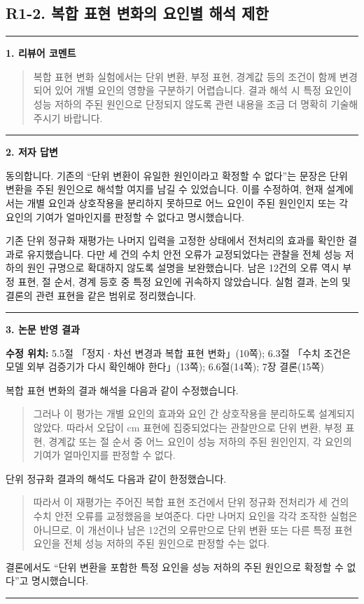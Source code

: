 \documentclass[11pt]{article}
\newcommand{\fieldheading}[2]{%
  \par\medskip\noindent
  {\color{#1}\rule{3pt}{1.25em}}\hspace{0.55em}\textbf{#2}\par\smallskip}
\newenvironment{reviewitem}[1]
  {\subsection*{#1}}
  {\par\medskip\hrule\bigskip}
\newenvironment{reviewercomment}
  {\fieldheading{reviewercolor}{1. 리뷰어 코멘트}%
   \begin{quote}}
  {\end{quote}}
\newenvironment{authorresponse}
  {\fieldheading{responsecolor}{2. 저자 답변}}
  {\par}
\newenvironment{manuscriptrevision}[1]
  {\fieldheading{revisioncolor}{3. 논문 반영 결과}%
   \textbf{수정 위치:} #1\par\smallskip}
  {\par}
\begin{document}
\clearpage
\begin{reviewitem}{R1-2. 복합 표현 변화의 요인별 해석 제한}
\begin{reviewercomment}
복합 표현 변화 실험에서는 단위 변환, 부정 표현, 경계값 등의 조건이 함께 변경되어 있어 개별 요인의 영향을 구분하기 어렵습니다. 결과 해석 시 특정 요인이 성능 저하의 주된 원인으로 단정되지 않도록 관련 내용을 조금 더 명확히 기술해 주시기 바랍니다.
\end{reviewercomment}
\begin{authorresponse}
동의합니다. 기존의 ``단위 변환이 유일한 원인이라고 확정할 수 없다''는 문장은
단위 변환을 주된 원인으로 해석할 여지를 남길 수 있었습니다.
이를 수정하여, 현재 설계에서는 개별 요인과 상호작용을 분리하지 못하므로
어느 요인이 주된 원인인지 또는 각 요인의 기여가 얼마인지를 판정할 수 없다고
명시했습니다.

기존 단위 정규화 재평가는 나머지 입력을 고정한 상태에서 전처리의 효과를
확인한 결과로 유지했습니다. 다만 세 건의 수치 안전 오류가 교정되었다는
관찰을 전체 성능 저하의 원인 규명으로 확대하지 않도록 설명을 보완했습니다.
남은 12건의 오류 역시 부정 표현, 절 순서, 경계 등호 중 특정 요인에 귀속하지
않았습니다. 실험 결과, 논의 및 결론의 관련 표현을 같은 범위로 정리했습니다.
\end{authorresponse}
\begin{manuscriptrevision}{5.5절 「정지ㆍ차선 변경과 복합 표현 변화」(10쪽); 6.3절 「수치 조건은 모델 외부 검증기가 다시 확인해야 한다」(13쪽); 6.6절(14쪽); 7장 결론(15쪽)}
복합 표현 변화의 결과 해석을 다음과 같이 수정했습니다.
\begin{quote}
그러나 이 평가는 개별 요인의 효과와 요인 간 상호작용을 분리하도록 설계되지 않았다. 따라서 오답이 cm 표현에 집중되었다는 관찰만으로 단위 변환, 부정 표현, 경계값 또는 절 순서 중 어느 요인이 성능 저하의 주된 원인인지, 각 요인의 기여가 얼마인지를 판정할 수 없다.
\end{quote}
단위 정규화 결과의 해석도 다음과 같이 한정했습니다.
\begin{quote}
따라서 이 재평가는 주어진 복합 표현 조건에서 단위 정규화 전처리가 세 건의 수치 안전 오류를 교정했음을 보여준다. 다만 나머지 요인을 각각 조작한 실험은 아니므로, 이 개선이나 남은 12건의 오류만으로 단위 변환 또는 다른 특정 표현 요인을 전체 성능 저하의 주된 원인으로 판정할 수는 없다.
\end{quote}
결론에서도 ``단위 변환을 포함한 특정 요인을 성능 저하의 주된 원인으로
확정할 수 없다''고 명시했습니다.
\end{manuscriptrevision}
\end{reviewitem}
\end{document}
